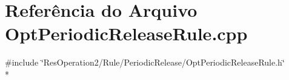 \section{Referência do Arquivo Opt\+Periodic\+Release\+Rule.\+cpp}
\label{_opt_periodic_release_rule_8cpp}
{\ttfamily \#include \char`\"{}Res\+Operation2/\+Rule/\+Periodic\+Release/\+Opt\+Periodic\+Release\+Rule.\+h\char`\"{}}\\*
